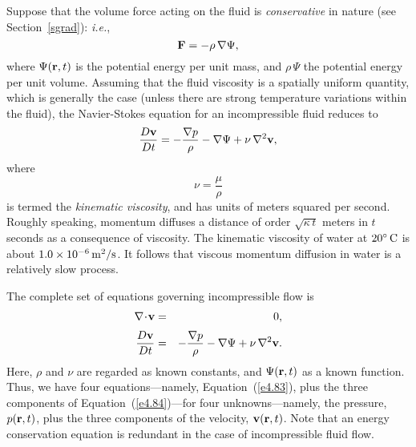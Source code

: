 Suppose that the volume force acting on the fluid is {\em conservative}\/ in nature (see Section~\ref{sgrad}): {\em i.e.},
\begin{equation}
{\bf F} = - \rho\,\nabla\Psi,
\end{equation}
where $\Psi({\bf r}, t)$ is the potential energy per unit mass, and $\rho\,\Psi$ the
potential energy per unit volume. Assuming that the fluid viscosity is a spatially uniform quantity, which is
generally the case (unless there are strong temperature variations within the fluid), the Navier-Stokes equation for an incompressible fluid reduces to
\begin{equation}\label{e5.78}
\frac{D{\bf v}}{Dt}=   - \frac{\nabla p}{\rho}-\nabla\Psi + \nu\,\nabla^2 {\bf v},
\end{equation}
where
\begin{equation}
\nu = \frac{\mu}{\rho}
\end{equation}
is termed the {\em kinematic viscosity}, and has units of meters squared per second. 
Roughly speaking, momentum diffuses a distance of order $\sqrt{\kappa\,t}$ meters in $t$ seconds as a consequence of viscosity.
The kinematic viscosity of water at $20^\circ\,{\rm C}$ is about $1.0\times 10^{-6}\,{\rm m^2/s}$. 
It follows that viscous momentum diffusion in water is a relatively slow process. 

The complete set of equations governing incompressible flow is
\begin{eqnarray}
\nabla\!\cdot\!{\bf v} &=& 0,\label{e4.83}\\[0.5ex]
\frac{D{\bf v}}{Dt}&=& - \frac{\nabla p}{\rho} -\nabla\Psi  + \nu\,\nabla^2 {\bf v}.\label{e4.84}
\end{eqnarray}
Here, $\rho$ and $\nu$ are regarded as known constants, and $\Psi({\bf r},t)$  as a known function. Thus, we have
four equations---namely, Equation~(\ref{e4.83}), plus the three components of Equation~(\ref{e4.84})---for
four unknowns---namely, the pressure, $p({\bf r}, t)$, plus the three components of the velocity, ${\bf v}({\bf r}, t)$. 
Note that an energy conservation equation is redundant in the case of incompressible fluid flow.

